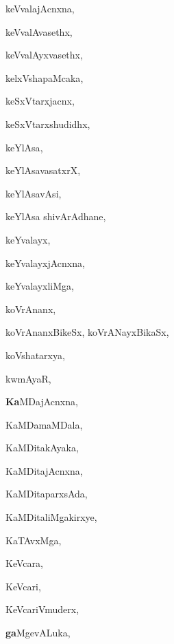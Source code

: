 \begin{multicols}{3}
{\noindent
{keVvalajAcnxna}, \pageref{keVvalajAcnxna}

\noindent
{keVvalAvasethx}, \pageref{keVvalAvasethx}

\noindent
{keVvalAyxvasethx}, \pageref{keVvalAyxvasethx}

\noindent
{kelxVshapaMcaka}, \pageref{kelxVshapaMcaka}

\noindent
{keSxVtarxjacnx}, \pageref{keSxVtarxjacnx}

\noindent
{keSxVtarxshudidhx}, \pageref{keSxVtarxshudidhx}

\noindent
{keYlAsa}, \pageref{keYlAsa}

\noindent
{keYlAsavasatxrX}, \pageref{keYlAsavasatxrX}

\noindent
{keYlAsavAsi}, \pageref{keYlAsavAsi}

\noindent
{keYlAsa shivArAdhane}, \pageref{keYlAsa shivArAdhane}

\noindent
{keYvalayx}, \pageref{keYvalayx}

\noindent
{keYvalayxjAcnxna}, \pageref{keYvalayxjAcnxna}

\noindent
{keYvalayxliMga}, \pageref{keYvalayxliMga}

\noindent
{koVrAnanx}, \pageref{koVrAnanx}

\noindent
{koVrAnanxBikeSx, koVrANayxBikaSx}, \pageref{koVrAnanxBikeSx, koVrANayxBikaSx}

\noindent
{koVshatarxya}, \pageref{koVshatarxya}

\noindent
{kwmAyaR}, \pageref{kwmAyaR}

\noindent
{{\large\textbf{Ka}}MDajAcnxna}, \pageref{KaMDajAcnxna}

\noindent
{KaMDamaMDala}, \pageref{KaMDamaMDala}

\noindent
{KaMDitakAyaka}, \pageref{KaMDitakAyaka}

\noindent
{KaMDitajAcnxna}, \pageref{KaMDitajAcnxna}

\noindent
{KaMDitaparxsAda}, \pageref{KaMDitaparxsAda}

\noindent
{KaMDitaliMgakirxye}, \pageref{KaMDitaliMgakirxye}

\noindent
{KaTAvxMga}, \pageref{KaTAvxMga}

\noindent
{KeVcara}, \pageref{KeVcara}

\noindent
{KeVcari}, \pageref{KeVcari}

\noindent
{KeVcariVmuderx}, \pageref{KeVcariVmuderx}

\noindent
{{\large\textbf{ga}}MgevALuka}, \pageref{gaMgevALuka}

}
\end{multicols}
